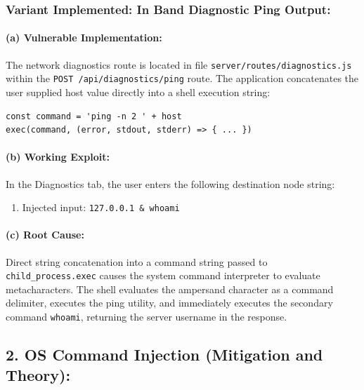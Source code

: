 \documentclass[11pt,a4paper]{article}
\begin{document}
\subsubsection*{Variant Implemented: In Band Diagnostic Ping Output:}

\paragraph*{(a) Vulnerable Implementation:}
The network diagnostics route is located in file \texttt{server/routes/diagnostics.js} within the \texttt{POST /api/diagnostics/ping} route. The application concatenates the user supplied host value directly into a shell execution string:
\begin{lstlisting}
const command = 'ping -n 2 ' + host
exec(command, (error, stdout, stderr) => { ... })
\end{lstlisting}

\paragraph*{(b) Working Exploit:}
In the Diagnostics tab, the user enters the following destination node string:
\begin{enumerate}
  \item Injected input: \texttt{127.0.0.1 \& whoami}
\end{enumerate}

\paragraph*{(c) Root Cause:}
Direct string concatenation into a command string passed to \texttt{child\_process.exec} causes the system command interpreter to evaluate metacharacters. The shell evaluates the ampersand character as a command delimiter, executes the ping utility, and immediately executes the secondary command \texttt{whoami}, returning the server username in the response.

\clearpage

\subsection*{2. OS Command Injection (Mitigation and Theory):}
\end{document}
